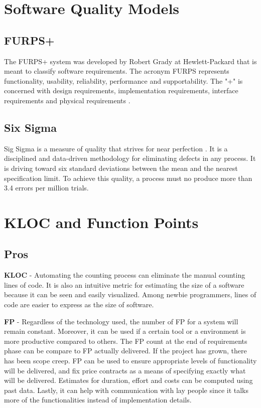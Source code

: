 \documentclass[a4paper, 11pt]{article}
\begin{document}
\section{Software Quality Models}
\subsection{FURPS+}
The FURPS+ system was developed by Robert Grady at Hewlett-Packard that is meant to classify software requirements. The acronym FURPS represents functionality, usability, reliability, performance and supportability. The "+" is concerned with design requirements, implementation requirements, interface requirements and physical requirements \cite{furps}.

\subsection{Six Sigma}
Sig Sigma is a measure of quality that strives for near perfection \cite{sigma}. It is a disciplined and data-driven methodology for eliminating defects in any process. It is driving toward six standard deviations between the mean and the nearest specification limit. To achieve this quality, a process must no produce more than 3.4 errors per million trials.

\section{KLOC and Function Points}
\subsection{Pros}
\textbf{KLOC} - Automating the counting process can eliminate the manual counting lines of code. It is also an intuitive metric for estimating the size of a software because it can be seen and easily visualized. Among newbie programmers, lines of code are easier to express as the size of software.

\textbf{FP} - Regardless of the technology used, the number of FP for a system will remain constant. Moreover, it can be used if a certain tool or a environment is more productive compared to others. The FP count at the end of requirements phase can be compare to FP actually delivered. If the project has grown, there has been scope creep. FP can be used to ensure appropriate levels of functionality will be delivered, and fix price contracts as a means of specifying exactly what will be delivered. Estimates for duration, effort and costs can be computed using past data. Lastly, it can help with communication with lay people since it talks more of the functionalities instead of implementation details.
\end{document}
